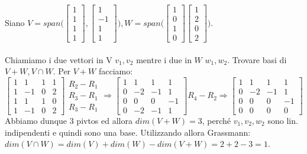 \begin{example}
Siano $V = span\Bigg(\begin{bmatrix}1\\1\\1\\1\end{bmatrix}, \begin{bmatrix}1\\-1\\1\\1\end{bmatrix}\Bigg), W = span\Bigg(\begin{bmatrix}1\\0\\1\\0\end{bmatrix}\begin{bmatrix}1\\2\\0\\2\end{bmatrix}\Bigg)$.\\\\
Chiamiamo i due vettori in V $v_1, v_2$ mentre i due in $W$ $w_1, w_2$. Trovare basi di $V + W, V \cap W$. Per $V+W$ facciamo:
\[
\begin{bmatrix}
1 & 1 & 1 & 1\\
1 & -1 & 0 & 2\\
1 & 1 & 1 & 0\\
1 & -1 & 0 & 2
\end{bmatrix}
\begin{array}{l}
    R_2 - R_1\\
    R_3 - R_1\\
    R_3 - R_1
\end{array}
\Rightarrow
\begin{bmatrix}
1 & 1 & 1 & 1\\
0 & -2 & -1 & 1\\
0 & 0 & 0 & -1\\
0 & -2 & -1 & 1
\end{bmatrix}
R_4 - R_2
\Rightarrow
\begin{bmatrix}
1 & 1 & 1 & 1\\
0 & -2 & -1 & 1\\
0 & 0 & 0 & -1\\
0 & 0 & 0 & 0
\end{bmatrix}
\]
Abbiamo dunque 3 pivtos ed allora $dim(V+W) = 3$, perché $v_1, v_2, w_2$ sono lin. indipendenti e quindi sono una base. Utilizzando allora Grassmann: $dim(V \cap W) = dim(V) + dim(W) - dim(V+W) = 2 + 2 - 3 = 1$.\\

\end{example}
